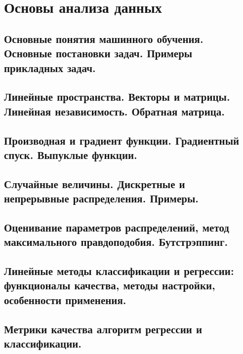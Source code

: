 \chapter{Основы анализа данных}

%

\begin{multicols}{2}
    \raggedcolumns
    \section{Основные понятия машинного обучения. Основные постановки задач. Примеры
    прикладных задач.}

    \section{Линейные пространства. Векторы и матрицы. Линейная независимость. Обратная
    матрица.}

    \section{Производная и градиент функции. Градиентный спуск. Выпуклые функции.}

    \section{Случайные величины. Дискретные и непрерывные распределения. Примеры.}

    \section{Оценивание параметров распределений, метод максимального правдоподобия.
    Бутстрэппинг.}

    \section{Линейные методы классификации и регрессии: функционалы качества, методы
    настройки, особенности применения.}

    \section{Метрики качества алгоритм регрессии и классификации.}


\end{multicols}
